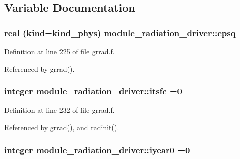 \subsection{Variable Documentation}
\subsubsection[{\texorpdfstring{epsq}{epsq}}]{\setlength{\rightskip}{0pt plus 5cm}real (kind=kind\+\_\+phys) module\+\_\+radiation\+\_\+driver\+::epsq\hspace{0.3cm}{\ttfamily [private]}}\hypertarget{namespacemodule__radiation__driver_a0b0bf0fa8723b80d0891ec3327d187d7}{}\label{namespacemodule__radiation__driver_a0b0bf0fa8723b80d0891ec3327d187d7}


Definition at line 225 of file grrad.\+f.



Referenced by grrad().

\subsubsection[{\texorpdfstring{itsfc}{itsfc}}]{\setlength{\rightskip}{0pt plus 5cm}integer module\+\_\+radiation\+\_\+driver\+::itsfc =0\hspace{0.3cm}{\ttfamily [private]}}\hypertarget{namespacemodule__radiation__driver_a9ee6a89464bf206cc07ea30d7eeaaeb8}{}\label{namespacemodule__radiation__driver_a9ee6a89464bf206cc07ea30d7eeaaeb8}


Definition at line 232 of file grrad.\+f.



Referenced by grrad(), and radinit().

\subsubsection[{\texorpdfstring{iyear0}{iyear0}}]{\setlength{\rightskip}{0pt plus 5cm}integer module\+\_\+radiation\+\_\+driver\+::iyear0 =0\hspace{0.3cm}{\ttfamily [private]}}\hypertarget{namespacemodule__radiation__driver_a4d755de48d0aa83f337a2a907ac7d8a2}{}\label{namespacemodule__radiation__driver_a4d755de48d0aa83f337a2a907ac7d8a2}


